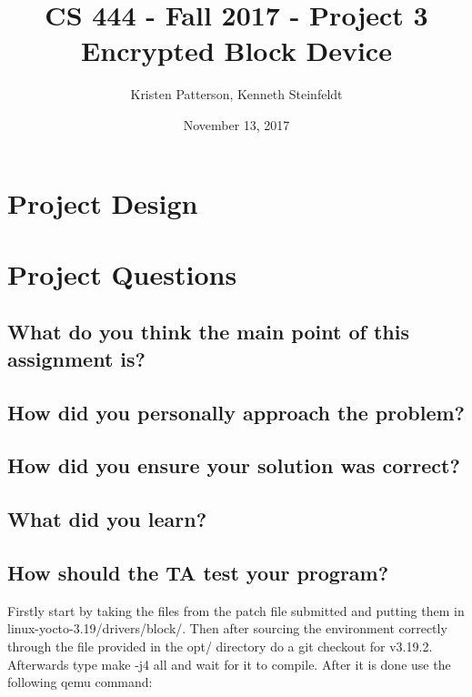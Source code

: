 \documentclass[10pt,letterpaper,onecolumn,draftclsnofoot]{IEEEtran}
\begin{document}
\begin{titlepage}

	\title{CS 444 - Fall 2017 - Project 3 \\ Encrypted Block Device}
	\author{Kristen Patterson, Kenneth Steinfeldt}
	\date{November 13, 2017}
	\maketitle
	\vspace{4cm}
	\begin{abstract}
		\noindent 
			\noindent
	\end{abstract}
\end{titlepage}

\section{Project Design}

\section{Project Questions}
\subsection{What do you think the main point of this assignment is?}

\subsection{How did you personally approach the problem?}

\subsection{How did you ensure your solution was correct?}

\subsection{What did you learn?}

\subsection{How should the TA test your program?}
Firstly start by taking the files from the patch file submitted and putting them in linux-yocto-3.19/drivers/block/.
Then after sourcing the environment correctly through the file provided in the opt/ directory do a git checkout for v3.19.2.
Afterwards type make -j4 all and wait for it to compile. After it is done use the following qemu command:
\end{document}
